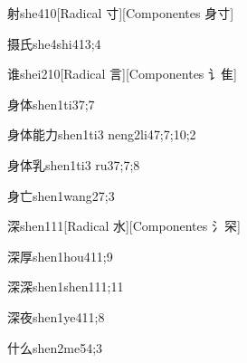 \begin{verbete}{射}{she4}{10}[Radical 寸][Componentes 身寸]
\end{verbete}

\begin{verbete}{摄氏}{she4shi4}{13;4}
\end{verbete}

\begin{verbete}{谁}{shei2}{10}[Radical 言][Componentes 讠隹]
\end{verbete}

\begin{verbete}{身体}{shen1ti3}{7;7}
\end{verbete}

\begin{verbete}{身体能力}{shen1ti3 neng2li4}{7;7;10;2}
\end{verbete}

\begin{verbete}{身体乳}{shen1ti3 ru3}{7;7;8}
\end{verbete}

\begin{verbete}{身亡}{shen1wang2}{7;3}
\end{verbete}

\begin{verbete}{深}{shen1}{11}[Radical 水][Componentes 氵罙]
\end{verbete}

\begin{verbete}{深厚}{shen1hou4}{11;9}
\end{verbete}

\begin{verbete}{深深}{shen1shen1}{11;11}
\end{verbete}

\begin{verbete}{深夜}{shen1ye4}{11;8}
\end{verbete}

\begin{verbete}{什么}{shen2me5}{4;3}
\end{verbete}

